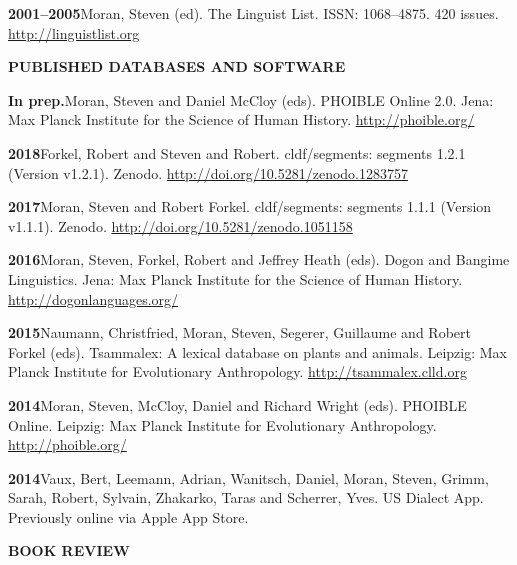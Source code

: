 \documentclass[11pt]{article}
\newcommand{\hangpara}{
 \setlength{\parindent}{0in} %
 \hangindent=0.42in %
}
\begin{document}
\vskip 6pt
\hangpara
{\bf 2001--2005}\hspace{1ex}Moran, Steven (ed). The Linguist List. ISSN: 1068--4875. 420 issues. \url{http://linguistlist.org}

\vskip 20pt
\begin{flushleft}
{\bf PUBLISHED DATABASES AND SOFTWARE}
\end{flushleft}

\hangpara{\bf In prep.}\hspace{1ex}Moran, Steven and Daniel McCloy (eds). PHOIBLE Online 2.0. Jena: Max Planck Institute for the Science of Human History. \url{http://phoible.org/}

\vskip 6pt
\hangpara{\bf 2018}\hspace{1ex}Forkel, Robert and Steven and Robert. cldf/segments: segments 1.2.1 (Version v1.2.1). Zenodo. \url{http://doi.org/10.5281/zenodo.1283757}

\vskip 6pt
\hangpara{\bf 2017}\hspace{1ex}Moran, Steven and Robert Forkel. cldf/segments: segments 1.1.1 (Version v1.1.1). Zenodo. \url{http://doi.org/10.5281/zenodo.1051158}

\vskip 6pt
\hangpara{\bf 2016}\hspace{1ex}Moran, Steven, Forkel, Robert and Jeffrey Heath (eds). Dogon and Bangime Linguistics. Jena: Max Planck Institute for the Science of Human History. \url{http://dogonlanguages.org/}

\vskip 6pt
\hangpara{\bf 2015}\hspace{1ex}Naumann, Christfried, Moran, Steven, Segerer, Guillaume and Robert Forkel (eds). 
Tsammalex: A lexical database on plants and animals. Leipzig: Max Planck Institute for Evolutionary Anthropology.  \url{http://tsammalex.clld.org}

\vskip 6pt
\hangpara{\bf 2014}\hspace{1ex}Moran, Steven, McCloy, Daniel and Richard Wright (eds). PHOIBLE Online. Leipzig: Max Planck Institute for Evolutionary Anthropology. \url{http://phoible.org/}

\vskip 6pt
\hangpara{\bf 2014}\hspace{1ex}Vaux, Bert, Leemann, Adrian, Wanitsch, Daniel, Moran, Steven, Grimm, Sarah, Robert, Sylvain, Zhakarko, Taras and Scherrer, Yves. US Dialect App. Previously online via Apple App Store. %

\vskip 20pt
\begin{flushleft}
{\bf BOOK REVIEW}
\end{flushleft}
\end{document}
